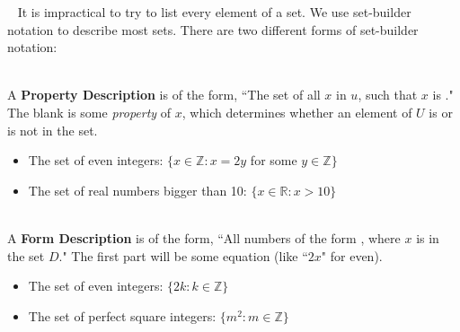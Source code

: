 \documentclass[a4paper,12pt]{book}
\begin{document}
        \begin{intro}{\ }
            It is impractical to try to list every element of a set.
            We use set-builder notation to describe most sets.
            There are two different forms of set-builder notation:

            ~\\
            A \textbf{Property Description} is of the form,
            ``The set of all $x$ in $u$, such that $x$ is \fitb."
            The blank is some \textit{property} of $x$, which
            determines whether an element of $U$ is or is not in the set.

            \begin{itemize}
                \item   The set of even integers:
                    $\{ x \in \mathbb{Z} : x = 2y$ for some $y \in \mathbb{Z} \}$
                \item   The set of real numbers bigger than 10:
                    $\{ x \in \mathbb{R} : x > 10 \}$
            \end{itemize}

            ~\\
            A \textbf{Form Description} is of the form,
            ``All numbers of the form \fitb, where $x$ is in the set $D$."
            The first part will be some equation (like ``$2x$" for even).
            
            \begin{itemize}
                \item   The set of even integers:
                    $\{ 2k : k \in \mathbb{Z} \}$
                \item   The set of perfect square integers:
                    $\{ m^{2} : m \in \mathbb{Z} \}$
            \end{itemize}
        \end{intro}
\end{document}
